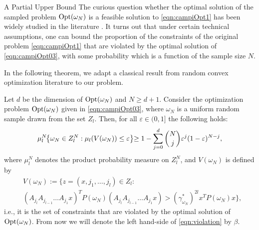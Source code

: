 \begin{subsection}{A Partial Upper Bound}
The curious question whether the optimal solution of the sampled problem $\text{Opt}(\omega_N)$ is a feasible solution to \eqref{eqn:campiOpt1} has been widely studied in the literature \cite{campi}. It turns out that under certain technical assumptions, one can bound the proportion of the constraints of the original problem \eqref{eqn:campiOpt1} that are violated by the optimal solution of \eqref{eqn:campiOpt03}, with some probability which is a function of the sample size $N$. 

In the following theorem, we adapt a classical result from random convex optimization literature to our problem.



\begin{thm}\label{mainTheorem0}
Let $d$ be the dimension of $\text{Opt}(\omega_N)$ and $N \geq d+1$. Consider the optimization problem $\text{Opt}(\omega_N)$ given in \eqref{eqn:campiOpt03}, where $\omega_N$ is a uniform random sample drawn from the set $Z_l$.
Then, for all $\varepsilon \in (0,1]$ the following holds:
\begin{equation}\label{eqn:violation}
\mu_l^N\hspace{-1mm}\left\{ \omega_N \in Z_l^N: \mu_l(V(\omega_N)) \leq \varepsilon \right\}\hspace{-1mm} \geq 1- \sum_{j=0}^{d} \binom{N}{j}\varepsilon^j (1-\varepsilon)^{N-j},
\end{equation}
where $\mu_l^N$ denotes the product probability measure on $Z_l^N$, and $V(\omega_N)$ is defined by \small{
\begin{equation*} 
\begin{aligned}
& V(\omega_N) := \{z=(x,j_{1},\dots,j_{l}) \in Z_l: \\
& (A_{j_l} A_{j_{l-1}} \dots A_{j_1} x)^T P(\omega_N)(A_{j_l} A_{j_{l-1}} \dots A_{j_1} x) > (\gamma_{\omega_N}^{*})^{2l} x^T P(\omega_N) x\},
\end{aligned}
\end{equation*}
}
i.e., it is the set of constraints that are violated by the optimal solution of $\text{Opt}(\omega_N)$. From now we will denote the left hand-side of \eqref{eqn:violation} by $\beta$.
\end{thm}




\end{subsection}
